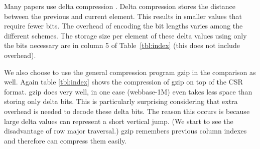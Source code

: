 Many papers use delta compression \cite{prelim:townsend, prelim:kourtis, prelim:kestur}. Delta compression stores the distance between the previous and current element. This results in smaller values that require fewer bits. The overhead of encoding the bit lengths varies among the different schemes. The storage size per element of these delta values using only the bits necessary are in column 5 of Table~\ref{tbl:index} (this does not include overhead).\par
We also choose to use the general compression program gzip in the comparison as well. Again table \ref{tbl:index} shows the compression of gzip on top of the CSR format. gzip does very well, in one case (webbase-1M) even takes less space than storing only delta bits. This is particularly surprising considering that extra overhead is needed to decode these delta bits. The reason this occurs is because large delta values can represent a short vertical jump. (We start to see the disadvantage of row major traversal.) gzip remembers previous column indexes and therefore can compress them easily.\par
